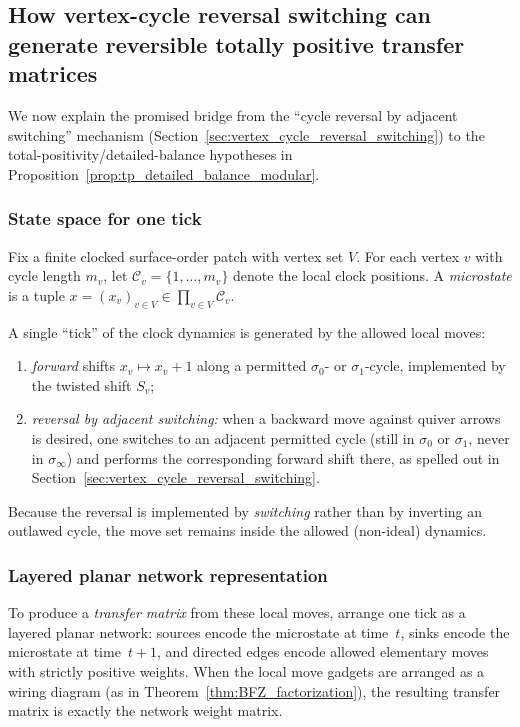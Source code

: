 \documentclass[11pt,oneside]{amsbook}
\numberwithin{equation}{section}
\theoremstyle{plain}
\theoremstyle{definition}
\theoremstyle{remark}
\begin{document}
\subsection{How vertex-cycle reversal switching can generate reversible totally positive transfer matrices}
\label{sec:cycle_reversal_to_tp_transfer}

We now explain the promised bridge from the ``cycle reversal by adjacent switching'' mechanism (Section~\ref{sec:vertex_cycle_reversal_switching}) to the total-positivity/detailed-balance hypotheses in Proposition~\ref{prop:tp_detailed_balance_modular}.

\subsubsection{State space for one tick}
Fix a finite clocked surface-order patch with vertex set $V$.
For each vertex $v$ with cycle length $m_v$, let $\mathcal{C}_v=\{1,\dots,m_v\}$ denote the local clock positions.
A \emph{microstate} is a tuple $x=(x_v)_{v\in V}\in \prod_{v\in V}\mathcal{C}_v$.

A single ``tick'' of the clock dynamics is generated by the allowed local moves:
\begin{enumerate}[label=(\roman*)]
\item \emph{forward} shifts $x_v\mapsto x_v+1$ along a permitted $\sigma_0$- or $\sigma_1$-cycle, implemented by the twisted shift $S_v$;
\item \emph{reversal by adjacent switching:} when a backward move against quiver arrows is desired, one switches to an adjacent permitted cycle (still in $\sigma_0$ or $\sigma_1$, never in $\sigma_\infty$) and performs the corresponding forward shift there, as spelled out in Section~\ref{sec:vertex_cycle_reversal_switching}.
\end{enumerate}
Because the reversal is implemented by \emph{switching} rather than by inverting an outlawed cycle, the move set remains inside the allowed (non-ideal) dynamics.

\subsubsection{Layered planar network representation}
To produce a \emph{transfer matrix} from these local moves, arrange one tick as a layered planar network:
sources encode the microstate at time~$t$, sinks encode the microstate at time~$t+1$, and directed edges encode allowed elementary moves with strictly positive weights.
When the local move gadgets are arranged as a wiring diagram (as in Theorem~\ref{thm:BFZ_factorization}), the resulting transfer matrix is exactly the network weight matrix.
\end{document}

